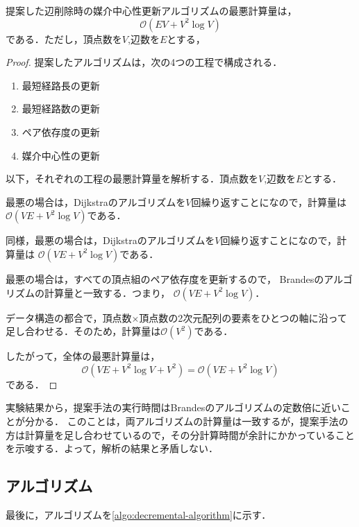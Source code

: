 \begin{lemma}
  提案した辺削除時の媒介中心性更新アルゴリズムの最悪計算量は，
  \[ \mathcal{O}(EV+V^2\log V) \]
  である．ただし，頂点数を$V$,辺数を$E$とする，
\end{lemma}
\begin{proof}
  提案したアルゴリズムは，次の4つの工程で構成される．
  \begin{enumerate}
  \item 最短経路長の更新
  \item 最短経路数の更新
  \item ペア依存度の更新
  \item 媒介中心性の更新
  \end{enumerate}

  以下，それぞれの工程の最悪計算量を解析する．頂点数を$V$,辺数を$E$とする．

  最悪の場合は，Dijkstraのアルゴリズムを$V$回繰り返すことになので，計算量は
  $\mathcal{O}(VE+V^2\log V)$である．

  同様，最悪の場合は，Dijkstraのアルゴリズムを$V$回繰り返すことになので，計算量は
  $\mathcal{O}(VE+V^2\log V)$である．

  最悪の場合は，すべての頂点組のペア依存度を更新するので，
  Brandesのアルゴリズムの計算量と一致する．つまり，
  $\mathcal{O}(VE+V^2\log V)$．

  データ構造の都合で，頂点数$\times$頂点数の2次元配列の要素をひとつの軸に沿って
  足し合わせる．そのため，計算量は$\mathcal{O}(V^2)$である．

  したがって，全体の最悪計算量は，
  \[ \mathcal{O}(VE+V^2\log V+V^2)=\mathcal{O}(VE+V^2\log V) \]
  である．
\end{proof}

実験結果から，提案手法の実行時間はBrandesのアルゴリズムの定数倍に近いことが分かる．
このことは，両アルゴリズムの計算量は一致するが，提案手法の方は計算量を足し合わせているので，その分計算時間が余計にかかっていることを示唆する．よって，解析の結果と矛盾しない．

\subsection{アルゴリズム}
\label{subsect:decremental-algorithm}
最後に，アルゴリズムを\ref{algo:decremental-algorithm}に示す．

